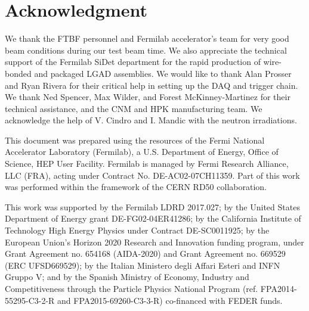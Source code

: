 \documentclass[preprint,1p]{elsarticle}
\begin{document}
\section*{Acknowledgment}

We thank the FTBF personnel and Fermilab accelerator's team for very good beam
conditions during our test beam time. We also appreciate the technical support
of the Fermilab SiDet department for the rapid production of wire-bonded and
packaged LGAD assemblies. We would like to thank Alan Prosser and Ryan Rivera
for their critical help in setting up the DAQ and trigger chain. We thank Ned
Spencer, Max Wilder, and Forest McKinney-Martinez for their technical
assistance, and the CNM and HPK manufacturing team. We acknowledge the help of
V. Cindro and I. Mandic with the neutron irradiations.

This document was prepared using the resources of the Fermi National Accelerator
Laboratory (Fermilab), a U.S. Department of Energy, Office of Science, HEP User
Facility. Fermilab is managed by Fermi Research Alliance, LLC (FRA), acting
under Contract No. DE-AC02-07CH11359. Part of this work was performed within the
framework of the CERN RD50 collaboration.

This work was supported by the Fermilab LDRD 2017.027; by the United States
Department of Energy grant DE-FG02-04ER41286; by the California Institute of
Technology High Energy Physics under Contract DE-SC0011925; by the European
Union's Horizon 2020 Research and Innovation funding program, under Grant
Agreement no. 654168 (AIDA-2020) and Grant Agreement no. 669529 (ERC
UFSD669529); by the Italian Ministero degli Affari Esteri and INFN Gruppo V; and
by the Spanish Ministry of Economy, Industry and Competitiveness through the
Particle Physics National Program (ref. FPA2014-55295-C3-2-R and
FPA2015-69260-C3-3-R) co-financed with FEDER funds.









{}





\end{document}
